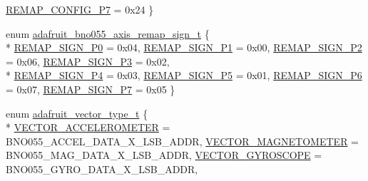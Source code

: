 \begin{DoxyCompactItemize}
\hyperlink{classAdafruit__BNO055_a14148c0000d1f13e4438c6dca1e386f2a2c855fbe9e915b8f846d2fb76595fee9}{R\+E\+M\+A\+P\+\_\+\+C\+O\+N\+F\+I\+G\+\_\+\+P7} = 0x24
 \}
\item 
enum \hyperlink{classAdafruit__BNO055_a2456a57a97fb940f07b08319580b2e2f}{adafruit\+\_\+bno055\+\_\+axis\+\_\+remap\+\_\+sign\+\_\+t} \{ \\*
\hyperlink{classAdafruit__BNO055_a2456a57a97fb940f07b08319580b2e2fa5404965af5a7b32681f3bb1027e68353}{R\+E\+M\+A\+P\+\_\+\+S\+I\+G\+N\+\_\+\+P0} = 0x04, 
\hyperlink{classAdafruit__BNO055_a2456a57a97fb940f07b08319580b2e2faced743dfcd5f5bf5e9a41be47eb8cb67}{R\+E\+M\+A\+P\+\_\+\+S\+I\+G\+N\+\_\+\+P1} = 0x00, 
\hyperlink{classAdafruit__BNO055_a2456a57a97fb940f07b08319580b2e2fa8da49877f98a9ee4edde173216cce8e3}{R\+E\+M\+A\+P\+\_\+\+S\+I\+G\+N\+\_\+\+P2} = 0x06, 
\hyperlink{classAdafruit__BNO055_a2456a57a97fb940f07b08319580b2e2fa9028255038e953d91171b3840c5191c9}{R\+E\+M\+A\+P\+\_\+\+S\+I\+G\+N\+\_\+\+P3} = 0x02, 
\\*
\hyperlink{classAdafruit__BNO055_a2456a57a97fb940f07b08319580b2e2fa05d7712bc1c8d3b3e1aac382e5d21eb3}{R\+E\+M\+A\+P\+\_\+\+S\+I\+G\+N\+\_\+\+P4} = 0x03, 
\hyperlink{classAdafruit__BNO055_a2456a57a97fb940f07b08319580b2e2fad1bbfd659ea8e2dbdf957a26381ec771}{R\+E\+M\+A\+P\+\_\+\+S\+I\+G\+N\+\_\+\+P5} = 0x01, 
\hyperlink{classAdafruit__BNO055_a2456a57a97fb940f07b08319580b2e2fab725b0e2dc1b7d7feabb20dc8e4376c3}{R\+E\+M\+A\+P\+\_\+\+S\+I\+G\+N\+\_\+\+P6} = 0x07, 
\hyperlink{classAdafruit__BNO055_a2456a57a97fb940f07b08319580b2e2faff37eaad5a9abf43dee7059b22ab9c38}{R\+E\+M\+A\+P\+\_\+\+S\+I\+G\+N\+\_\+\+P7} = 0x05
 \}
\item 
enum \hyperlink{classAdafruit__BNO055_aca6c5acffc9a752e5309ff2bb21f3e25}{adafruit\+\_\+vector\+\_\+type\+\_\+t} \{ \\*
\hyperlink{classAdafruit__BNO055_aca6c5acffc9a752e5309ff2bb21f3e25a7683862660e6744c7b986635b8a1c275}{V\+E\+C\+T\+O\+R\+\_\+\+A\+C\+C\+E\+L\+E\+R\+O\+M\+E\+T\+ER} = B\+N\+O055\+\_\+\+A\+C\+C\+E\+L\+\_\+\+D\+A\+T\+A\+\_\+\+X\+\_\+\+L\+S\+B\+\_\+\+A\+D\+DR, 
\hyperlink{classAdafruit__BNO055_aca6c5acffc9a752e5309ff2bb21f3e25a1c60f2563c7ef6aae996bebed41081bd}{V\+E\+C\+T\+O\+R\+\_\+\+M\+A\+G\+N\+E\+T\+O\+M\+E\+T\+ER} = B\+N\+O055\+\_\+\+M\+A\+G\+\_\+\+D\+A\+T\+A\+\_\+\+X\+\_\+\+L\+S\+B\+\_\+\+A\+D\+DR, 
\hyperlink{classAdafruit__BNO055_aca6c5acffc9a752e5309ff2bb21f3e25a02367b4ed33bd911181d1fb0c1ceb1f0}{V\+E\+C\+T\+O\+R\+\_\+\+G\+Y\+R\+O\+S\+C\+O\+PE} = B\+N\+O055\+\_\+\+G\+Y\+R\+O\+\_\+\+D\+A\+T\+A\+\_\+\+X\+\_\+\+L\+S\+B\+\_\+\+A\+D\+DR, 

\end{DoxyCompactItemize}
